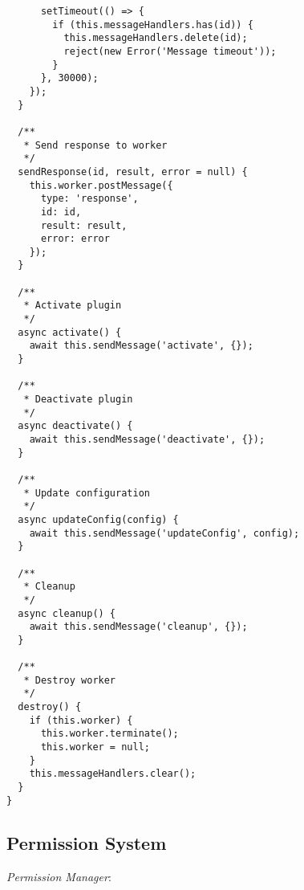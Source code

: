 \documentclass[11pt]{article}
\begin{document}
\begin{verbatim}
      setTimeout(() => {
        if (this.messageHandlers.has(id)) {
          this.messageHandlers.delete(id);
          reject(new Error('Message timeout'));
        }
      }, 30000);
    });
  }
  
  /**
   * Send response to worker
   */
  sendResponse(id, result, error = null) {
    this.worker.postMessage({
      type: 'response',
      id: id,
      result: result,
      error: error
    });
  }
  
  /**
   * Activate plugin
   */
  async activate() {
    await this.sendMessage('activate', {});
  }
  
  /**
   * Deactivate plugin
   */
  async deactivate() {
    await this.sendMessage('deactivate', {});
  }
  
  /**
   * Update configuration
   */
  async updateConfig(config) {
    await this.sendMessage('updateConfig', config);
  }
  
  /**
   * Cleanup
   */
  async cleanup() {
    await this.sendMessage('cleanup', {});
  }
  
  /**
   * Destroy worker
   */
  destroy() {
    if (this.worker) {
      this.worker.terminate();
      this.worker = null;
    }
    this.messageHandlers.clear();
  }
}
\end{verbatim}
\subsection{Permission System}
\label{sec:org0053474}

\emph{Permission Manager}:
\end{document}
